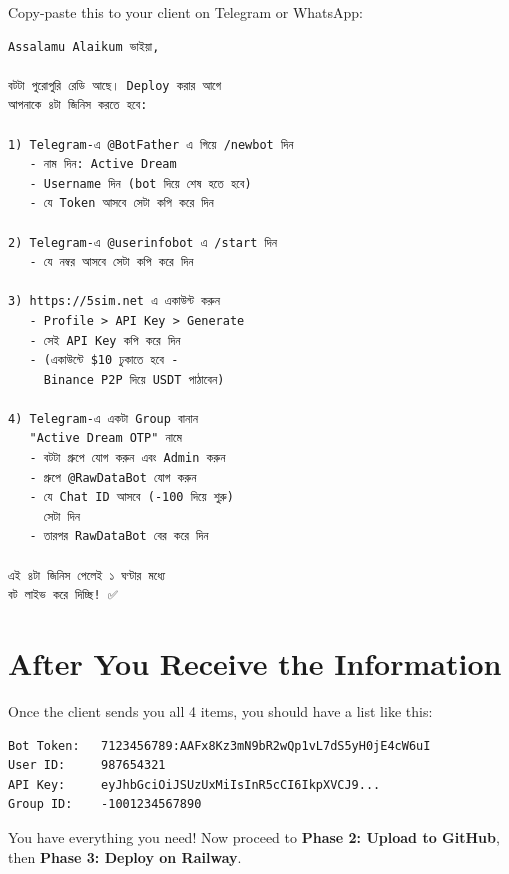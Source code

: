Copy-paste this to your client on Telegram or WhatsApp:

\begin{lstlisting}[style=envstyle, title={Message to Client (Bangla)}]
Assalamu Alaikum ভাইয়া,

বটটা পুরোপুরি রেডি আছে। Deploy করার আগে 
আপনাকে ৪টা জিনিস করতে হবে:

1) Telegram-এ @BotFather এ গিয়ে /newbot দিন
   - নাম দিন: Active Dream
   - Username দিন (bot দিয়ে শেষ হতে হবে)
   - যে Token আসবে সেটা কপি করে দিন

2) Telegram-এ @userinfobot এ /start দিন
   - যে নম্বর আসবে সেটা কপি করে দিন

3) https://5sim.net এ একাউন্ট করুন
   - Profile > API Key > Generate
   - সেই API Key কপি করে দিন
   - (একাউন্টে $10 ঢুকাতে হবে - 
     Binance P2P দিয়ে USDT পাঠাবেন)

4) Telegram-এ একটা Group বানান 
   "Active Dream OTP" নামে
   - বটটা গ্রুপে যোগ করুন এবং Admin করুন
   - গ্রুপে @RawDataBot যোগ করুন
   - যে Chat ID আসবে (-100 দিয়ে শুরু) 
     সেটা দিন
   - তারপর RawDataBot বের করে দিন

এই ৪টা জিনিস পেলেই ১ ঘণ্টার মধ্যে 
বট লাইভ করে দিচ্ছি! ✅
\end{lstlisting}

\section{After You Receive the Information}

Once the client sends you all 4 items, you should have a list like this:

\begin{lstlisting}[style=envstyle, title={Your collected values (example)}]
Bot Token:   7123456789:AAFx8Kz3mN9bR2wQp1vL7dS5yH0jE4cW6uI
User ID:     987654321
API Key:     eyJhbGciOiJSUzUxMiIsInR5cCI6IkpXVCJ9...
Group ID:    -1001234567890
\end{lstlisting}

\begin{successbox}
You have everything you need! Now proceed to \textbf{Phase 2: Upload to GitHub}, then \textbf{Phase 3: Deploy on Railway}.
\end{successbox}
